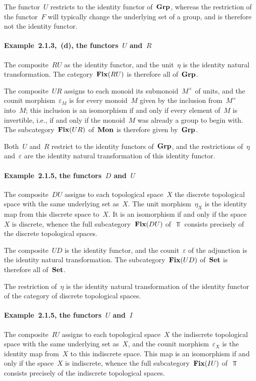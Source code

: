 The functor~$U$ restricts to the identity functor of~$\mathbf{Grp}$, whereas the restriction of the functor~$F$ will typically change the underlying set of a group, and is therefore not the identity functor.

\paragraph{Example~2.1.3,~(d), the functors~$U$ and~$R$}
The composite~$RU$ as the identity functor, and the unit~$η$ is the identity natural transformation.
The category~$\mathop{\mathbf{Fix}}(RU)$ is therefore all of~$\mathbf{Grp}$.

The composite~$UR$ assigns to each monoid its submonoid~$M^×$ of units, and the counit morphism~$ε_M$ is for every monoid~$M$ given by the inclusion from~$M^×$ into~$M$;
this inclusion is an isomorphism if and only if every element of~$M$ is invertible, i.e., if and only if the monoid~$M$ was already a group to begin with.
The subcategory~$\mathop{\mathbf{Fix}}(UR)$ of~$\mathbf{Mon}$ is therefore given by~$\mathbf{Grp}$.

Both~$U$ and~$R$ restrict to the identity functors of~$\mathbf{Grp}$, and the restrictions of~$η$ and~$ε$ are the identity natural transformation of this identity functor.

\paragraph{Example~2.1.5, the functors~$D$ and~$U$}
The composite~$DU$ assigns to each topological space~$X$ the discrete topological space with the same underlying set as~$X$.
The unit morphism~$η_X$ is the identity map from this discrete space to~$X$.
It is an isomorphism if and only if the space~$X$ is discrete, whence the full subcategory~$\mathop{\mathbf{Fix}}(DU)$ of~$\Top$ consists precisely of the discrete topological spaces.

The composite~$UD$ is the identity functor, and the counit~$ε$ of the adjunction is the identity natural transformation.
The subcategory~$\mathop{\mathbf{Fix}}(UD)$ of~$\mathbf{Set}$ is therefore all of~$\mathbf{Set}$.

The restriction of~$η$ is the identity natural transformation of the identity functor of the category of discrete topological spaces.

\paragraph{Example~2.1.5, the functors~$U$ and~$I$}
The composite~$IU$ assigns to each topological space~$X$ the indiscrete topological space with the same underlying set as~$X$, and the counit morphism~$ε_X$ is the identity map from~$X$ to this indiscrete space.
This map is an isomorphism if and only if the space~$X$ is indiscrete, whence the full subcategory~$\mathop{\mathbf{Fix}}(IU)$ of~$\Top$ consists precisely of the indiscrete topological spaces.

